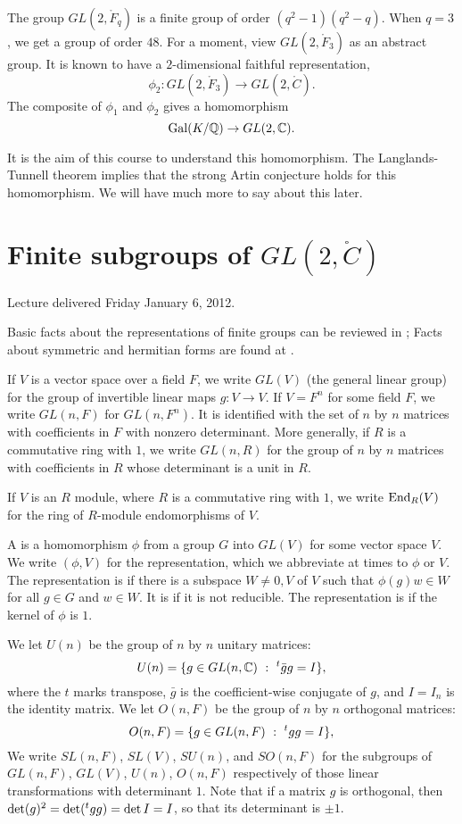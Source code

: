 \documentclass{amsart}
\def\t#1{\hbox{}^t#1}
\begin{document}
The group $GL(2,\ring{F}_q)$ is a finite group of order
$(q^2-1)(q^2-q)$.  When $q=3$, we get a group of order $48$.  For a
moment, view $GL(2,\ring{F}_3)$ as an abstract group.  It is known
to have a $2$-dimensional faithful representation,
\[
\phi_2 : GL(2,\ring{F}_3) \to GL(2,\ring{C}).
\]
The composite of $\phi_1$ and $\phi_2$ gives a homomorphism
\[
{\operatorname{Gal}}(K/\mathbb{Q}) \to GL(2,\mathbb{C}).
\]

It is the aim of this course to understand this homomorphism.  The
Langlands-Tunnell theorem implies that the strong Artin conjecture
holds for this homomorphism.  We will have much more to say about this
later.


\newpage
\section{Finite subgroups of $GL(2,\ring{C})$}

Lecture delivered Friday January 6, 2012.


Basic facts about the representations of finite groups can be reviewed
in \cite[p.~326, Sec. VII.4]{knapp-basic}; Facts about symmetric and
hermitian 
forms are found at \cite[p.~250,~Sec.~VI.2,~VI.4]{knapp-basic}.

If $V$ is a vector space over a field $F$, we write $GL(V)$ (the
general linear group) for the group of invertible linear maps $g:V\to
V$.  If $V=F^n$ for some field $F$, we write $GL(n,F)$ for
$GL(n,F^n)$.  It is identified with the set of $n$ by $n$ matrices
with coefficients in $F$ with nonzero determinant.  More generally, if
$R$ is a commutative ring with $1$, we write $GL(n,R)$ for the group
of $n$ by $n$ matrices with coefficients in $R$ whose determinant is a
unit in $R$.

If $V$ is an $R$ module, where $R$ is a commutative ring with $1$, 
we write ${\operatorname{End}}_R(V)$ for the ring of $R$-module endomorphisms of $V$.

A  is a homomorphism $\phi$ from a group $G$
into $GL(V)$ for some vector space $V$.  We write $(\phi,V)$ for the
representation, which we abbreviate at times to $\phi$ or $V$.  
The representation is  if there is
a subspace $W\ne 0,V$ of $V$ such that $\phi(g)w\in W$ for all $g\in
G$ and $w\in W$.  It is  if it is not reducible.
The representation is  if the kernel of $\phi$ is
$1$.

We let $U(n)$ be the group of $n$ by $n$ unitary matrices:
\[
U(n) = \{ g \in GL(n,\ring{C})  \mid \t{\bar g} g = I\},
\]
where the $t$ marks transpose, $\bar g$ is the coefficient-wise
conjugate of $g$, and $I=I_n$ is the identity matrix.  We let $O(n,F)$
be the group of $n$ by $n$ orthogonal matrices:
\[
O(n,F) = \{ g \in GL(n,F) \mid \t{g} g = I\},
\]
We write $SL(n,F)$, $SL(V)$, $SU(n)$, and $SO(n,F)$ for the subgroups
of $GL(n,F)$, $GL(V)$, $U(n)$, $O(n,F)$ respectively of those linear
transformations with determinant $1$.  Note that if a matrix $g$ is orthogonal,
then $\det(g)^2 = \det(\t{g}g) = \det{I} = I$, so that its determinant is $\pm 1$.
\end{document}
